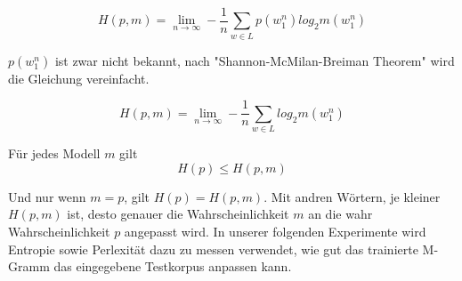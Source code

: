 \begin{equation}
H(p,m)=\lim_{n\to\infty}-\frac{1}{n}\sum_{w\in L}p(w_{1}^{n})log_{2}m(w_{1}^{n})
\end{equation}

$p(w_{1}^{n})$ ist zwar nicht bekannt, nach "Shannon-McMilan-Breiman Theorem" wird die Gleichung vereinfacht. 

\begin{equation}
H(p,m)=\lim_{n\to\infty}-\frac{1}{n}\sum_{w\in L}log_{2}m(w_{1}^{n})
\end{equation}

F\"ur jedes Modell $m$ gilt \\
\begin{equation}
H(p)\leq H(p,m)
\end{equation}

Und nur wenn $m=p$, gilt $H(p)=H(p,m)$. Mit andren W\"ortern, je kleiner $H(p,m)$ ist, desto genauer die Wahrscheinlichkeit $m$ an die wahr Wahrscheinlichkeit $p$ angepasst wird.
In unserer folgenden Experimente wird Entropie sowie Perlexit\"at dazu zu messen verwendet, wie gut das trainierte M-Gramm das eingegebene Testkorpus anpassen kann.

